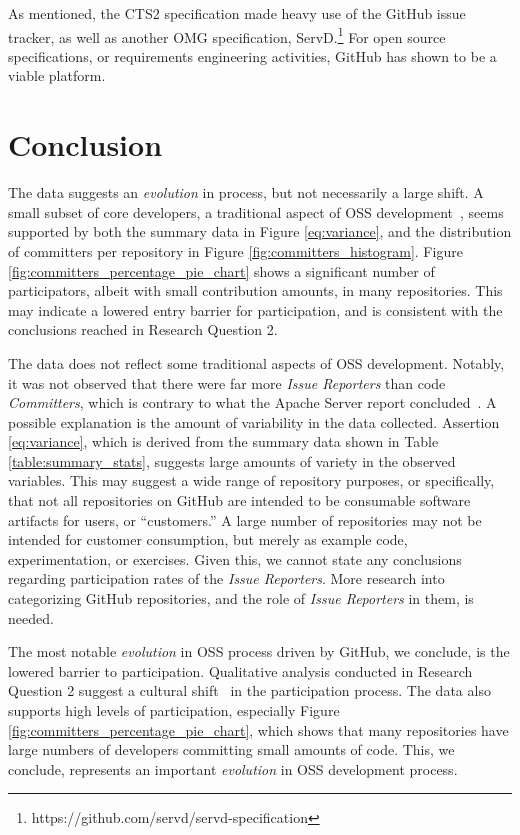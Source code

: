 \documentclass{proc}
\begin{document}
{{{{{As mentioned, the CTS2 specification made heavy use of the GitHub issue tracker, as well as another OMG\textsuperscript{\textregistered} specification, ServD.\footnote{https://github.com/servd/servd-specification} For open source specifications, or requirements engineering activities, GitHub has shown to be a viable platform. 

\section{Conclusion}
The data suggests an \textit{evolution} in process, but not necessarily a large shift. A small subset of core developers, a traditional aspect of OSS development~\cite{mockus2000case,mockus2002two,krishnamurthy2002cave}, seems supported by both the summary data in Figure \ref{eq:variance}, and the distribution of committers per repository in Figure \ref{fig:committers_histogram}. Figure \ref{fig:committers_percentage_pie_chart} shows a significant number of participators, albeit with small contribution amounts, in many repositories. This may indicate a lowered entry barrier for participation, and is consistent with the conclusions reached in Research Question 2.

The data does not reflect some traditional aspects of OSS development. Notably, it was not observed that there were far more \emph{Issue Reporters} than code \emph{Committers}, which is contrary to what the Apache Server report concluded~\cite{mockus2000case}. A possible explanation is the amount of variability in the data collected. Assertion \ref{eq:variance}, which is derived from the summary data shown in Table \ref{table:summary_stats}, suggests large amounts of variety in the observed variables. This may suggest a wide range of repository purposes, or specifically, that not all repositories on GitHub are intended to be consumable software artifacts for users, or ``customers.'' A large number of repositories may not be intended for customer consumption, but merely as example code, experimentation, or exercises. Given this, we cannot state any conclusions regarding participation rates of the \emph{Issue Reporters}. More research into categorizing GitHub repositories, and the role of \emph{Issue Reporters} in them, is needed.

The most notable \textit{evolution} in OSS process driven by GitHub, we conclude, is the lowered barrier to participation. Qualitative analysis conducted in Research Question 2 suggest a cultural shift~\cite{begel2013social,github_interview} in the participation process. The data also supports high levels of participation, especially Figure \ref{fig:committers_percentage_pie_chart}, which shows that many repositories have large numbers of developers committing small amounts of code. This, we conclude, represents an important \textit{evolution} in OSS development process.

}}}}}
\end{document}
